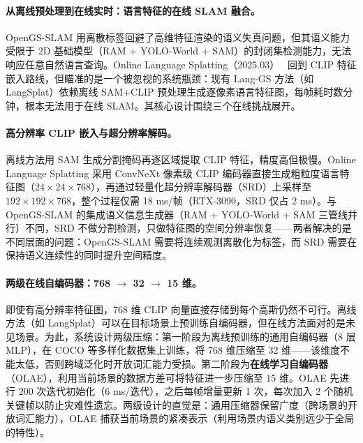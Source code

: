 \paragraph{从离线预处理到在线实时：语言特征的在线 SLAM 融合。}
OpenGS-SLAM 用离散标签回避了高维特征渲染的语义失真问题，但其语义能力受限于 2D 基础模型（RAM + YOLO-World + SAM）的封闭集检测能力，无法响应任意自然语言查询。Online Language Splatting（2025.03）~\cite{2503_09447} 回到 CLIP 特征嵌入路线，但瞄准的是一个被忽视的系统瓶颈：现有 Lang-GS 方法（如 LangSplat）依赖离线 SAM+CLIP 预处理生成逐像素语言特征图，每帧耗时数分钟，根本无法用于在线 SLAM。其核心设计围绕三个在线挑战展开。

\paragraph{高分辨率 CLIP 嵌入与超分辨率解码。}
离线方法用 SAM 生成分割掩码再逐区域提取 CLIP 特征，精度高但极慢。Online Language Splatting 采用 ConvNeXt 像素级 CLIP 编码器直接生成粗粒度语言特征图（$24 \times 24 \times 768$），再通过轻量化超分辨率解码器（SRD）上采样至 $192 \times 192 \times 768$，整个过程仅需 18 ms/帧（RTX-3090，SRD 仅占 2 ms）。与 OpenGS-SLAM 的集成语义信息生成器（RAM + YOLO-World + SAM 三管线并行）不同，SRD 不做分割检测，只做特征图的空间分辨率恢复——两者解决的是不同层面的问题：OpenGS-SLAM 需要将连续观测离散化为标签，而 SRD 需要在保持语义连续性的同时提升空间精度。

\paragraph{两级在线自编码器：768 $\to$ 32 $\to$ 15 维。}
即使有高分辨率特征图，768 维 CLIP 向量直接存储到每个高斯仍然不可行。离线方法（如 LangSplat）可以在目标场景上预训练自编码器，但在线方法面对的是未见场景。为此，系统设计两级压缩：第一阶段为离线预训练的通用自编码器（8 层 MLP），在 COCO 等多样化数据集上训练，将 768 维压缩至 32 维——该维度不能太低，否则跨域泛化时开放词汇能力受损。第二阶段为\textbf{在线学习自编码器}（OLAE），利用当前场景的数据方差可将特征进一步压缩至 15 维。OLAE 先进行 200 次迭代初始化（6 ms/迭代），之后每帧增量更新 1 次，每次加入 2 个随机关键帧以防止灾难性遗忘。两级设计的直觉是：通用压缩器保留广度（跨场景的开放词汇能力），OLAE 捕获当前场景的紧凑表示（利用场景内语义类别远少于全局的特性）。

